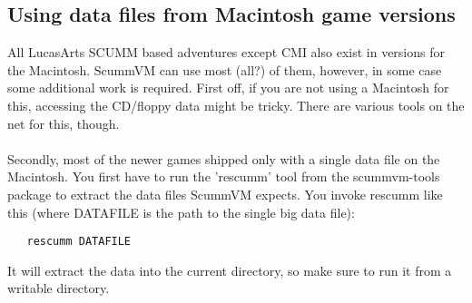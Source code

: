 \subsection {Using data files from Macintosh game versions}
All LucasArts SCUMM based adventures except CMI also exist in versions for the
Macintosh. ScummVM can use most (all?) of them, however, in some case some
additional work is required. First off, if you are not using a Macintosh for
this, accessing the CD/floppy data might be tricky. There are various tools on
the net for this, though.\\
\quad\\
Secondly, most of the newer games shipped only with a  single data file on the
Macintosh. You first have to run the 'rescumm' tool from the scummvm-tools
package to extract the data files ScummVM expects. You invoke rescumm like
this (where DATAFILE is the path to the single big data file):\\
\begin{verbatim}
   rescumm DATAFILE
\end{verbatim}
It will extract the data into the current directory, so make sure to
run it from a writable directory.
